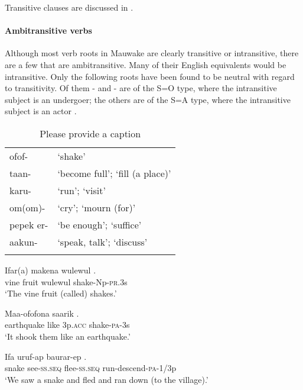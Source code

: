 Transitive clauses are discussed in .

\paragraph{Ambitransitive verbs}\label{sec:3:a:z:y:x}
{}
Although most verb roots in Mauwake are clearly transitive or intransitive, there are a few that are ambitransitive. Many of their English equivalents would be intransitive. Only the following roots have been found to be neutral with regard to transitivity. Of them - and - are of the S=O type, where the intransitive subject is an undergoer; the others are of the S=A type, where the intransitive subject is an actor \citep[124]{Dixon2010b}.

\begin{table}
\caption{Please provide a caption}
\label{} 
\begin{tabular}{ll}
\mytoprule
ofof- &`shake'\\
taan- &`become full'; `fill (a place)'\\
karu- &`run'; `visit'\\
om(om)- &`cry'; `mourn (for)'\\
pepek er- &`be enough'; `suffice'\\
aakun- &`speak, talk'; `discuss'\\
\mybottomrule
\end{tabular}

\end{table}

\ea%
\label{ex:3:x1827}
\gll Ifar(a) makena wulewul . \\
vine fruit wulewul shake-Np-\textsc{pr}.3s\\
\glt`The vine fruit (called)  shakes.'
\z

\ea%
\label{ex:3:x1826}
\gll Maa-ofofona saarik  . \\
earthquake like 3p.\textsc{acc} shake-\textsc{pa}-3s\\
\glt`It shook them like an earthquake.'
\z

\ea%
\label{ex:3:x304}
\gll Ifa uruf-ap baurar-ep . \\
snake see-\textsc{ss}.\textsc{seq} flee-\textsc{ss}.\textsc{seq} run-descend-\textsc{pa}-1/3p \\
\glt`We saw a snake and fled and ran down (to the village).'
\z

